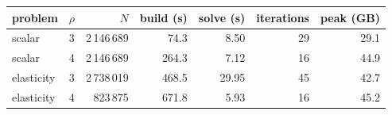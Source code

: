 {\small
\begin{tabular}{llrrrrr}
\toprule
problem & $\rho$ & $N$ & build (s) & solve (s) & iterations & peak (GB) \\
\midrule
scalar & 3 & 2\,146\,689 & 74.3 & 8.50 & 29 & 29.1 \\
scalar & 4 & 2\,146\,689 & 264.3 & 7.12 & 16 & 44.9 \\
elasticity & 3 & 2\,738\,019 & 468.5 & 29.95 & 45 & 42.7 \\
elasticity & 4 & 823\,875 & 671.8 & 5.93 & 16 & 45.2 \\
\bottomrule
\end{tabular}
}
